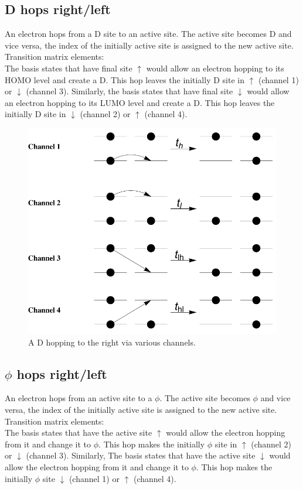 \documentclass[a4paper,twocolumn]{revtex4-1} %
\newcommand{\da}{\downarrow}
\newcommand{\ua}{\uparrow}
\begin{document}
\subsection{D hops right/left}
An electron hops from a D site to an active site.
The active site becomes D and vice versa, the index of the initially active site is assigned to the new active site. 
\\Transition matrix elements:\\
The basis states that have final site $\ua$ would allow 
an electron hopping to its HOMO level and create a D.
This hop leaves the initially D site in $\ua$ (channel 1) or $\da$  (channel 3).
Similarly,
the basis states that have final site $\da$ would allow 
an electron hopping to its LUMO level and create a D.
This hop leaves the initially D site in $\da$ (channel 2) or $\ua$  (channel 4).

\begin{figure}[htpb]
  \centering
  \includegraphics[width=0.4\columnwidth]{DhopsR}
  \caption{A D hopping to the right via various channels.
 \label{fig:dhops}}  
\end{figure}




\subsection{$\phi$ hops right/left}
An electron hops from an active site to a $\phi$.
The active site becomes $\phi$ and vice versa, the index of the initially active site is assigned to the new active site. 
\\Transition matrix elements:\\
The basis states that have the active site $\ua$ would allow 
the electron hopping from it and change it to $\phi$.
This hop makes the initially $\phi$ site in $\ua$ (channel 2) or $\da$  (channel 3).
Similarly,
The basis states that have the active site $\da$ would allow 
the electron hopping from it and change it to $\phi$.
This hop makes the initially $\phi$ site $\da$ (channel 1) or $\ua$  (channel 4).
\end{document}
